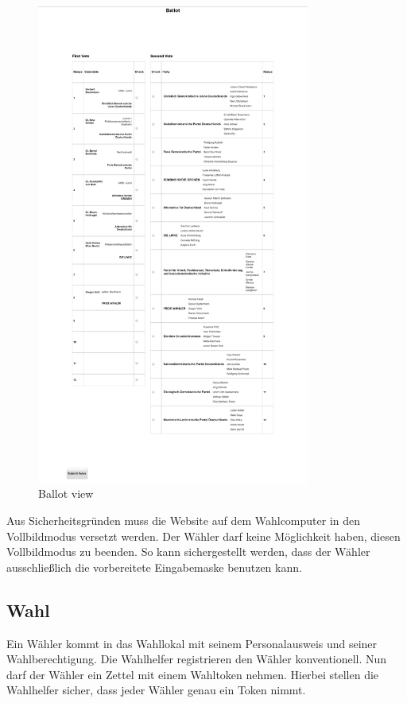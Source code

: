 \documentclass[a4paper]{scrreprt}
\begin{document}
\begin{figure}[H]
\centering
\includegraphics[width=0.8\textwidth]{images/ballot.png}
\caption {Ballot view}
\end{figure}

Aus Sicherheitsgründen muss die Website auf dem Wahlcomputer in den Vollbildmodus versetzt werden. Der Wähler darf keine Möglichkeit haben, diesen Vollbildmodus zu beenden. So kann sichergestellt werden, dass der Wähler ausschließlich die vorbereitete Eingabemaske benutzen kann.

\subsection{Wahl}

Ein Wähler kommt in das Wahllokal mit seinem Personalausweis und seiner Wahlberechtigung.
Die Wahlhelfer registrieren den Wähler konventionell.
Nun darf der Wähler ein Zettel mit einem Wahltoken nehmen.
Hierbei stellen die Wahlhelfer sicher, dass jeder Wähler genau ein Token nimmt. \\
\end{document}
